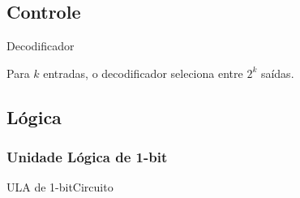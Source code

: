\subsection{Controle}


\begin{frame}{Decodificador}

Para \alert{$k$} entradas, o \alert{decodificador} seleciona entre \alert{$2^k$} saídas.

\begin{center}
                     
\end{center}

\end{frame}
    


\subsection{Lógica}

\begin{frame}
\frametitle{Unidade Lógica de 1-bit}

\begin{center}

\end{center}

\end{frame}




\begin{frame}{ULA de 1-bit}{Circuito}

\begin{center}

\end{center}

\end{frame}

